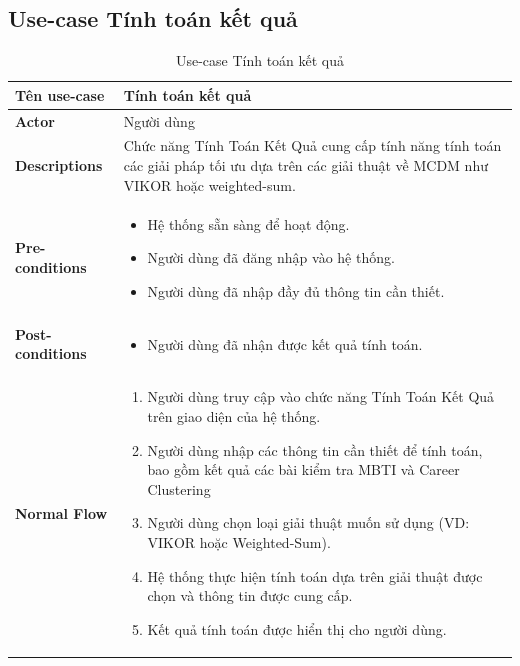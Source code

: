 \subsection{Use-case Tính toán kết quả}
    \begin{longtable}[H]{|l|p{}|}
        \caption{Use-case Tính toán kết quả}
        \\ \hline
        \textbf{Tên use-case} & Tính toán kết quả \\
        \hline
        \textbf{Actor} & Người dùng \\
        \hline
        \textbf{Descriptions} &  Chức năng Tính Toán Kết Quả cung cấp tính năng tính toán các giải pháp tối ưu dựa trên các giải thuật về MCDM như VIKOR hoặc weighted-sum. \\
        \hline
        \textbf{Pre-conditions} & \vspace{-0.75cm} \begin{itemize}[leftmargin=4mm]
            \setlength\itemsep{0em}
            \item Hệ thống sẵn sàng để hoạt động.
            \item Người dùng đã đăng nhập vào hệ thống.
            \item Người dùng  đã nhập đầy đủ thông tin cần thiết.
        \end{itemize} \\
        
        \hline

        \textbf{Post-conditions} &  \vspace{-0.75cm} \begin{itemize}[leftmargin=4mm]
            \setlength\itemsep{0em}
            \item Người dùng đã nhận được kết quả tính toán.
        \end{itemize} \\
        
        \hline
        
        \textbf{Normal Flow} &  \vspace{-0.75cm} 
            \begin{enumerate}[leftmargin=5.5mm]
                \setlength\itemsep{0em}
                \item Người dùng truy cập vào chức năng Tính Toán Kết Quả trên giao diện của hệ thống.
                \item Người dùng nhập các thông tin cần thiết để tính toán, bao gồm kết quả các bài kiểm tra MBTI và Career Clustering
                \item Người dùng chọn loại giải thuật muốn sử dụng (VD: VIKOR hoặc Weighted-Sum). 
                \item Hệ thống thực hiện tính toán dựa trên giải thuật được chọn và thông tin được cung cấp. 
                \item Kết quả tính toán được hiển thị cho người dùng. 
            \end{enumerate}\\
            

\end{longtable}
